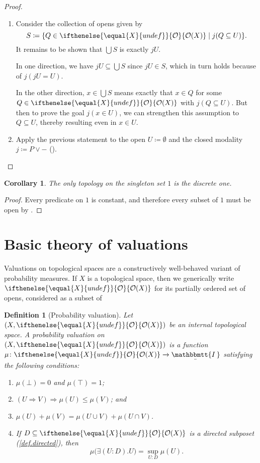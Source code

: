 \documentclass[reqno,11pt]{amsproc}
\theoremstyle{plain}
\newtheorem{corollary}[theorem]{Corollary}
\newtheorem{definition}[theorem]{Definition}
\theoremstyle{definition}
\renewcommand{\to}[1][]{\xrightarrow{#1}}
\newcommand{\ubar}[1]{\underaccent{\bar}{#1}}
\newcommand{\internal}[1]{\raisebox{-.03ex}{$\mathbbmtt{#1}$}}
\newcommand{\hs}{\hspace{1pt}}
\newcommand{\tii}{\ubar{\internal{I\hs\hs}}\!\hs}
\newcommand{\Op}[1][undef]{\ifthenelse{\equal{#1}{undef}}{\mathcal{O}}{\mathcal{O}(#1)}}
\newcommand{\imp}{\Rightarrow}
\let\originalleft\left
\let\originalright\right
\renewcommand{\left}{\mathopen{}\mathclose\bgroup\originalleft}
\renewcommand{\right}{\aftergroup\egroup\originalright}
\numberwithin{equation}{section}
\begin{document}
\begin{proof}
	\begin{enumerate}
		\item Consider the collection of opens given by 
			\[
				S \coloneqq \left\{ Q \in \Op[X] \mid j(Q \subseteq U) \right\}.
			\]
			It remains to be shown that $\bigcup S$ is exactly $jU$. 

			In one direction, we have $jU \subseteq \bigcup S$ since $jU \in S$, which in turn holds because of $j(jU = U)$.

			In the other direction, $x \in \bigcup S$ means exactly that $x \in Q$ for some $Q \in \Op[X]$ with $j(Q \subseteq U)$. But then to prove the goal $j(x \in U)$, we can strengthen this assumption to $Q \subseteq U$, thereby resulting even in $x \in U$.

		\item Apply the previous statement to the open $U \coloneqq \emptyset$ and the closed modality $j \coloneqq P \lor -$ (). \qedhere
	\end{enumerate}
\end{proof}

\begin{corollary}
	\label{top_on_one}
	The only topology on the singleton set $1$ is the discrete one.
\end{corollary}

\begin{proof}
	Every predicate on $1$ is constant, and therefore every subset of $1$ must be open by .
\end{proof}

\section{Basic theory of valuations}

Valuations on topological spaces are a constructively well-behaved variant of probability measures. If $X$ is a topological space, then we generically write $\Op[X]$ for its partially ordered set of opens, considered as a subset of 

\begin{definition}[Probability valuation]\label{def.prob_valuation}
Let $(X,\Op[X])$ be an internal topological space. A \emph{probability valuation} on $(X,\Op[X])$ is a function $\mu\colon\Op[X]\to\tii$ satisfying the following conditions:
\begin{enumerate}
	\item $\mu(\bot)=0$ and $\mu(\top)=1$;
	\item $(U\imp V)\imp\mu(U)\le\mu(V)$; and
	\item $\mu(U)+\mu(V)=\mu(U\cup V)+\mu(U\cap V)$.
	\item If $D\subseteq\Op[X]$ is a directed subposet (\cref{def.directed}), then
\[
	\mu\big(\exists(U:D).U\big)= \sup_{U: D}\mu(U).
\]
\end{enumerate}
\end{definition}
\end{document}
